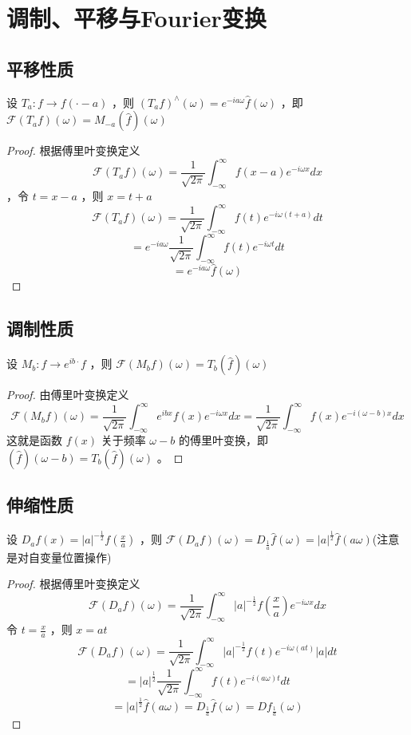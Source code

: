 \documentclass[linespread=1.5,openany]{book}%
\theoremstyle{plain}
\begin{document}
{			\chapter{调制、平移与Fourier变换}{
				\section{平移性质}
				设 \(T_a: f \to f(\cdot - a)\) ，则 \((T_af)^{\wedge}(\omega)=e^{-ia\omega}\hat{f}(\omega)\) ，即 \(\mathcal{F} (T_af)(\omega)=M_{-a}(\hat{f})(\omega)\) 
				\begin{proof}
					根据傅里叶变换定义 \[\mathcal{F}(T_af)(\omega)=\frac{1}{\sqrt{2\pi}}\int_{-\infty}^{\infty}f(x - a)e^{-i\omega x}dx\] ，令 \(t = x - a\) ，则 \(x = t + a\) 
					\[\mathcal{F}(T_af)(\omega)=\frac{1}{\sqrt{2\pi}}\int_{-\infty}^{\infty}f(t)e^{-i\omega (t + a)}dt\]
					\[=e^{-ia\omega}\frac{1}{\sqrt{2\pi}}\int_{-\infty}^{\infty}f(t)e^{-i\omega t}dt\]
					\[=e^{-ia\omega}\hat{f}(\omega)
					\]
				\end{proof}
				\section{调制性质}
				设 \(M_b: f \to e^{ib\cdot}f\) ，则 \(\mathcal{F}(M_bf)(\omega)=T_b(\hat{f})(\omega)\)
				\begin{proof}
					由傅里叶变换定义 \[\mathcal{F}(M_bf)(\omega)=\frac{1}{\sqrt{2\pi}}\int_{-\infty}^{\infty}e^{ibx}f(x)e^{-i\omega x}dx=\frac{1}{\sqrt{2\pi}}\int_{-\infty}^{\infty}f(x)e^{-i(\omega - b)x}dx\]
					这就是函数 \(f(x)\) 关于频率 \(\omega - b\) 的傅里叶变换，即 \((\hat{f})(\omega - b)=T_b(\hat{f})(\omega)\) 。
					
				\end{proof}
				\section{伸缩性质}
				设 \(D_af(x)=|a|^{-\frac{1}{2}}f(\frac{x}{a})\) ，则 \(\mathcal{F}(D_af)(\omega)=D_{\frac{1}{a}}\hat{f}(\omega)=|a|^{\frac{1}{2}}\hat{f}(a\omega)\)(注意是对自变量位置操作)
				\begin{proof}
					根据傅里叶变换定义 \[\mathcal{F}(D_af)(\omega)=\frac{1}{\sqrt{2\pi}}\int_{-\infty}^{\infty}|a|^{-\frac{1}{2}}f(\frac{x}{a})e^{-i\omega x}dx\] 令 \(t=\frac{x}{a}\) ，则 \(x = at\)  
					\[\mathcal{F}(D_af)(\omega)=\frac{1}{\sqrt{2\pi}}\int_{-\infty}^{\infty}|a|^{-\frac{1}{2}}f(t)e^{-i\omega (at)}|a|dt\]
					\[=|a|^{\frac{1}{2}}\frac{1}{\sqrt{2\pi}}\int_{-\infty}^{\infty}f(t)e^{-i(a\omega)t}dt\]
					\[=|a|^{\frac{1}{2}}\hat{f}(a\omega)=D_{\frac{1}{a}}\hat{f}(\omega)=Df_{\frac{1}{a}}(\omega)\]
				\end{proof}
}}
\end{document}
